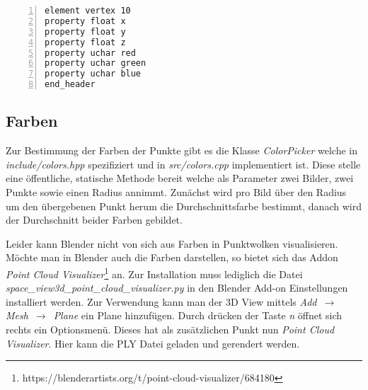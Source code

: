 \begin{lstlisting}[numbers=left, breaklines=true, breakatwhitespace=false, label=lst:ply_vertex_element, caption=Beispiel PLY Header für 10 Vertex Elemente mit den Attributen Position und Farbe]
element vertex 10
property float x
property float y
property float z
property uchar red
property uchar green
property uchar blue
end_header
\end{lstlisting}

\subsection{Farben}
Zur Bestimmung der Farben der Punkte gibt es die Klasse \emph{ColorPicker} welche in \emph{include/colors.hpp} spezifiziert und in \emph{src/colors.cpp} implementiert ist.
Diese stelle eine öffentliche, statische Methode bereit welche als Parameter zwei Bilder, zwei Punkte sowie einen Radius annimmt.
Zunächst wird pro Bild über den Radius um den übergebenen Punkt herum die Durchschnittsfarbe bestimmt, danach wird der Durchschnitt beider Farben gebildet.

Leider kann Blender nicht von sich aus Farben in Punktwolken visualisieren.
Möchte man in Blender auch die Farben darstellen, so bietet sich das Addon \emph{Point Cloud Visualizer}\footnote{https://blenderartists.org/t/point-cloud-visualizer/684180} an.
Zur Installation muss lediglich die Datei \emph{space\_view3d\_point\_cloud\_visualizer.py} in den Blender Add-on Einstellungen installiert werden.
Zur Verwendung kann man der 3D View mittels \emph{Add}  $\,\to\,$ \emph{Mesh} $\,\to\,$ \emph{Plane} ein Plane hinzufügen.
Durch drücken der Taste \emph{n} öffnet sich rechts ein Optionsmenü.
Dieses hat als zusätzlichen Punkt nun \emph{Point Cloud Visualizer}.
Hier kann die PLY Datei geladen und gerendert werden\cite{blender_point_cloud_visualizer}.